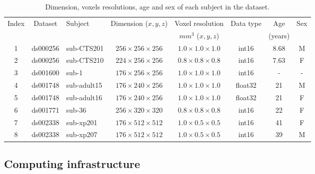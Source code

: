 \documentclass[lettersize,journal]{IEEEtran}
\begin{document}
{\begin{table}
  \begin{center}
    \begin{tabular}{c|c|l|c|c|c|c|c}
      Index & Dataset  & Subject     & Dimension ($x,y,z$)         & Voxel resolution            & Data type & Age     & Sex \\
            &          &             &                             & $mm^3$ ($x,y,z$)            &           & (years) &     \\
      \hline
      1     & ds000256 & sub-CTS201  & $256 \times 256 \times 256$ & $1.0 \times 1.0 \times 1.0$ & int16     & 8.68    & M   \\
      2     & ds000256 & sub-CTS210  & $224 \times 256 \times 256$ & $0.8 \times 0.8 \times 0.8$ & int16     & 7.63    & F   \\
      3     & ds001600 & sub-1       & $176 \times 256 \times 256$ & $1.0 \times 1.0 \times 1.0$ & int16     & -       & -   \\
      4     & ds001748 & sub-adult15 & $176 \times 240 \times 256$ & $1.0 \times 1.0 \times 1.0$ & float32   & 21      & M   \\
      5     & ds001748 & sub-adult16 & $176 \times 240 \times 256$ & $1.0 \times 1.0 \times 1.0$ & float32   & 21      & F   \\
      6     & ds001771 & sub-36      & $256 \times 320 \times 320$ & $0.8 \times 0.8 \times 0.8$ & int16     & 22      & F   \\
      7     & ds002338 & sub-xp201   & $176 \times 512 \times 512$ & $1.0 \times 0.5 \times 0.5$ & int16     & 41      & F   \\
      8     & ds002338 & sub-xp207   & $176 \times 512 \times 512$ & $1.0 \times 0.5 \times 0.5$ & int16     & 39      & M   \\
    \end{tabular}
  \end{center}
  \caption{Dimension, voxels resolutions, age and sex of each subject in the dataset.}
  \label{table:dataset_info}
\end{table}


\subsection{Computing infrastructure}
\label{subsec:computing_infrastructure}

}
\end{document}
